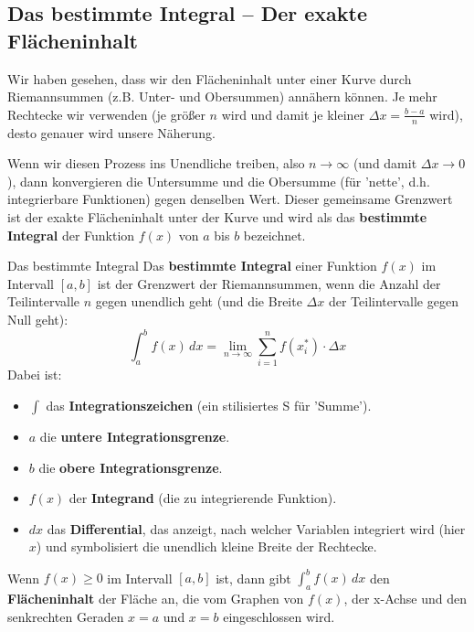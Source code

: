 \subsection{Das bestimmte Integral – Der exakte Flächeninhalt}
\label{subsec:bestimmtes_integral_neu} %

Wir haben gesehen, dass wir den Flächeninhalt unter einer Kurve durch Riemannsummen (z.B. Unter- und Obersummen) annähern können. Je mehr Rechtecke wir verwenden (je größer $n$ wird und damit je kleiner $\Delta x = \frac{b-a}{n}$ wird), desto genauer wird unsere Näherung.

Wenn wir diesen Prozess ins Unendliche treiben, also $n \to \infty$ (und damit $\Delta x \to 0$), dann konvergieren die Untersumme und die Obersumme (für 'nette', d.h. integrierbare Funktionen) gegen denselben Wert. Dieser gemeinsame Grenzwert ist der exakte Flächeninhalt unter der Kurve und wird als das \textbf{bestimmte Integral} der Funktion $f(x)$ von $a$ bis $b$ bezeichnet.

\begin{merksatzumgebung}{Das bestimmte Integral}
Das \textbf{bestimmte Integral} einer Funktion $f(x)$ im Intervall $[a,b]$ ist der Grenzwert der Riemannsummen, wenn die Anzahl der Teilintervalle $n$ gegen unendlich geht (und die Breite $\Delta x$ der Teilintervalle gegen Null geht):
\[ \int_{a}^{b} f(x) \,dx = \lim_{n \to \infty} \sum_{i=1}^{n} f(x_i^*) \cdot \Delta x \]
Dabei ist:
\begin{itemize}
    \item $\int$ das \textbf{Integrationszeichen} (ein stilisiertes S für 'Summe').
    \item $a$ die \textbf{untere Integrationsgrenze}.
    \item $b$ die \textbf{obere Integrationsgrenze}.
    \item $f(x)$ der \textbf{Integrand} (die zu integrierende Funktion).
    \item $dx$ das \textbf{Differential}, das anzeigt, nach welcher Variablen integriert wird (hier $x$) und symbolisiert die unendlich kleine Breite der Rechtecke.
\end{itemize}
Wenn $f(x) \ge 0$ im Intervall $[a,b]$ ist, dann gibt $\int_{a}^{b} f(x) \,dx$ den \textbf{Flächeninhalt} der Fläche an, die vom Graphen von $f(x)$, der x-Achse und den senkrechten Geraden $x=a$ und $x=b$ eingeschlossen wird.
\end{merksatzumgebung}

